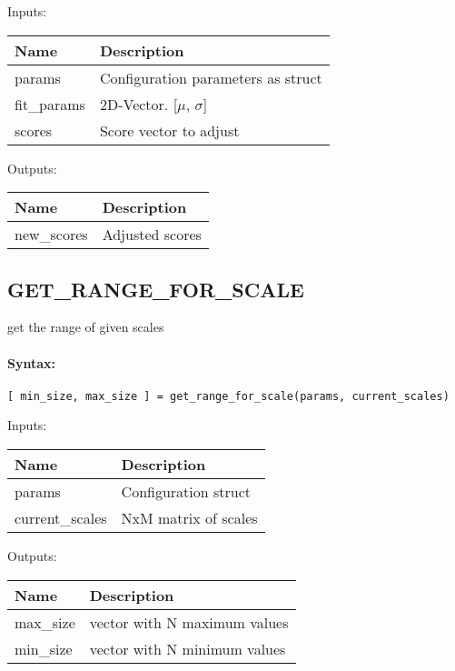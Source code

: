 \bigskip
Inputs:

\begin{tabular}{|p{}|p{}|}
\hline
\textbf{Name} & \textbf{Description} \\
\hline \hline
params & Configuration parameters as struct  \\ \hline
fit\_params & 2D-Vector. [$\mu$, $\sigma$]  \\ \hline
scores & Score vector to adjust  \\ \hline
\end{tabular}

\bigskip
Outputs:

\begin{tabular}{|p{}|p{}|}
\hline
\textbf{Name} & \textbf{Description} \\
\hline \hline
new\_scores & Adjusted scores  \\ \hline
\end{tabular}

\subsection{GET\_RANGE\_FOR\_SCALE}

get the range of given scales

\paragraph{Syntax:} \verb|[ min_size, max_size ] = get_range_for_scale(params, current_scales)|

\bigskip
Inputs:

\begin{tabular}{|p{}|p{}|}
\hline
\textbf{Name} & \textbf{Description} \\
\hline \hline
params & Configuration struct  \\ \hline
current\_scales & NxM matrix of scales  \\ \hline
\end{tabular}

\bigskip
Outputs:

\begin{tabular}{|p{}|p{}|}
\hline
\textbf{Name} & \textbf{Description} \\
\hline \hline
max\_size & vector with N maximum values  \\ \hline
min\_size & vector with N minimum values  \\ \hline
\end{tabular}

